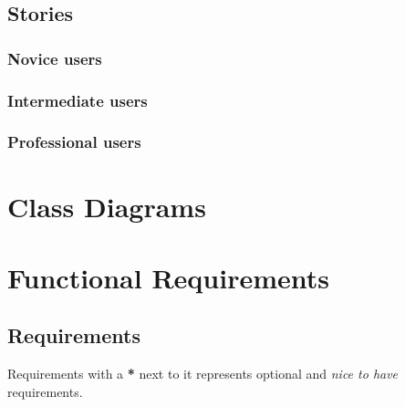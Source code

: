 \documentclass[11pt,a4paper]{article}
\begin{document}
\pagebreak

\subsection*{Stories}

\subsubsection*{Novice users}


\subsubsection*{Intermediate users}




\subsubsection*{Professional users}


\pagebreak

\section*{Class Diagrams}


\clearpage


\pagebreak

\section*{Functional Requirements}

\subsection*{Requirements}

Requirements with a \textbf{*} next to it represents optional and \textit{nice
    to have} requirements.
\end{document}
